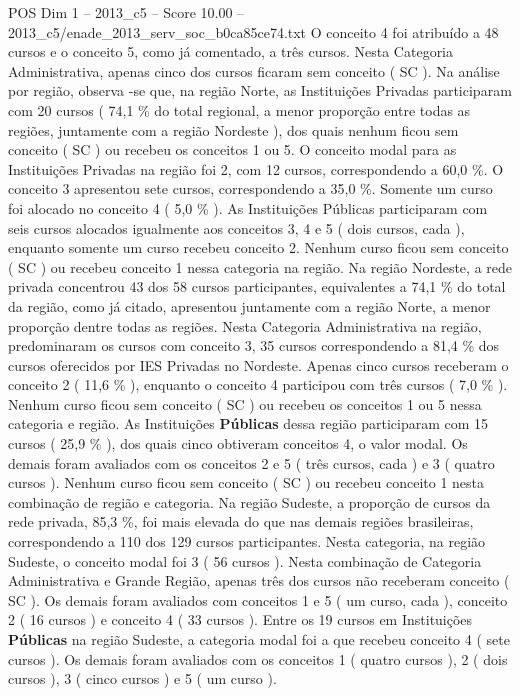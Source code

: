 \begin{textsample}{POS Dim 1 – 2013\_c5 – Score 10.00 – 2013\_c5/enade\_2013\_serv\_soc\_b0ca85ce74.txt}
O conceito 4 foi atribuído a 48 cursos e o conceito 5, como já comentado, a três cursos.
Nesta Categoria Administrativa, apenas cinco dos cursos ficaram sem conceito ( SC ).
Na análise por região, observa -se que, na região Norte, as Instituições Privadas participaram com 20 cursos ( 74,1 \% do total regional, a menor proporção entre todas as regiões, juntamente com a região Nordeste ), dos quais nenhum ficou sem conceito ( SC ) ou recebeu os conceitos 1 ou 5.
O conceito modal para as Instituições Privadas na região foi 2, com 12 cursos, correspondendo a 60,0 \%.
O conceito 3 apresentou sete cursos, correspondendo a 35,0 \%.
Somente um curso foi alocado no conceito 4 ( 5,0 \% ).
As Instituições Públicas participaram com seis cursos alocados igualmente aos conceitos 3, 4 e 5 ( dois cursos, cada ), enquanto somente um curso recebeu conceito 2.
Nenhum curso ficou sem conceito ( SC ) ou recebeu conceito 1 nessa categoria na região.
Na região Nordeste, a rede privada concentrou 43 dos 58 cursos participantes, equivalentes a 74,1 \% do total da região, como já citado, apresentou juntamente com a região Norte, a menor proporção dentre todas as regiões.
Nesta Categoria Administrativa na região, predominaram os cursos com conceito 3, 35 cursos correspondendo a 81,4 \% dos cursos oferecidos por IES Privadas no Nordeste.
Apenas cinco cursos receberam o conceito 2 ( 11,6 \% ), enquanto o conceito 4 participou com três cursos ( 7,0 \% ).
Nenhum curso ficou sem conceito ( SC ) ou recebeu os conceitos 1 ou 5 nessa categoria e região.
As Instituições \textbf{Públicas} dessa região participaram com 15 cursos ( 25,9 \% ), dos quais cinco obtiveram conceitos 4, o valor modal.
Os demais foram avaliados com os conceitos 2 e 5 ( três cursos, cada ) e 3 ( quatro cursos ).
Nenhum curso ficou sem conceito ( SC ) ou recebeu conceito 1 nesta combinação de região e categoria.
Na região Sudeste, a proporção de cursos da rede privada, 85,3 \%, foi mais elevada do que nas demais regiões brasileiras, correspondendo a 110 dos 129 cursos participantes.
Nesta categoria, na região Sudeste, o conceito modal foi 3 ( 56 cursos ).
Nesta combinação de Categoria Administrativa e Grande Região, apenas três dos cursos não receberam conceito ( SC ).
Os demais foram avaliados com conceitos 1 e 5 ( um curso, cada ), conceito 2 ( 16 cursos ) e conceito 4 ( 33 cursos ).
Entre os 19 cursos em Instituições \textbf{Públicas} na região Sudeste, a categoria modal foi a que recebeu conceito 4 ( sete cursos ).
Os demais foram avaliados com os conceitos 1 ( quatro cursos ), 2 ( dois cursos ), 3 ( cinco cursos ) e 5 ( um curso ).

\end{textsample}
